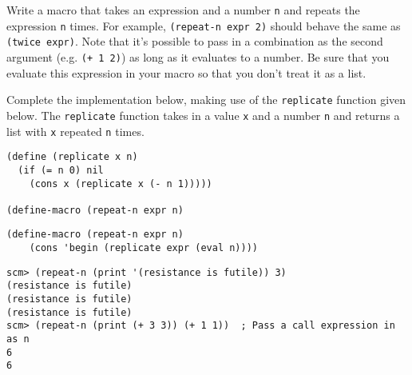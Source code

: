 \question Write a macro that takes an expression and a number \texttt{n} and
repeats the expression \texttt{n} times. For example, \texttt{(repeat-n expr
2)} should behave the same as \texttt{(twice expr)}. Note that it's possible to
pass in a combination as the second argument (e.g. \texttt{(+ 1 2)}) as long as
it evaluates to a number. Be sure that you evaluate this expression in your
macro so that you don't treat it as a list.

Complete the implementation below, making use of the \texttt{replicate}
function given below. The \texttt{replicate} function takes in a value \texttt{x}
and a number \texttt{n} and returns a list with \texttt{x} repeated \texttt{n} 
times.

\begin{lstlisting}
(define (replicate x n)
  (if (= n 0) nil
    (cons x (replicate x (- n 1)))))

(define-macro (repeat-n expr n)
\end{lstlisting}

\begin{solution}[.7in]
\begin{lstlisting}
(define-macro (repeat-n expr n)
    (cons 'begin (replicate expr (eval n))))
\end{lstlisting}
\end{solution}
\begin{lstlisting}
scm> (repeat-n (print '(resistance is futile)) 3)
(resistance is futile)
(resistance is futile)
(resistance is futile)
scm> (repeat-n (print (+ 3 3)) (+ 1 1))  ; Pass a call expression in as n
6
6
\end{lstlisting}
